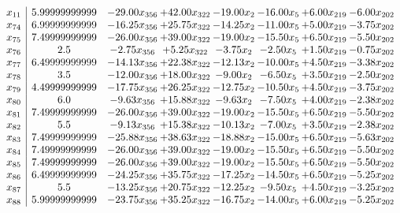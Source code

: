 \documentclass[8pt]{article}
\begin{document}
\[\begin{array}{c| c c@{\hskip 2pt} c@{\hskip 2pt} c@{\hskip 2pt} c@{\hskip 2pt} c@{\hskip 2pt} c@{\hskip 2pt} }
 x_{11}   &  5.99999999999 & -29.00 x_{356} & + 42.00 x_{322} & -19.00 x_{2} & -16.00 x_{5} & +  6.00 x_{219} & -6.00 x_{202}\\
 x_{74}   &  6.99999999999 & -16.25 x_{356} & + 25.75 x_{322} & -14.25 x_{2} & -11.00 x_{5} & +  5.00 x_{219} & -3.75 x_{202}\\
 x_{75}   &  7.49999999999 & -26.00 x_{356} & + 39.00 x_{322} & -19.00 x_{2} & -15.50 x_{5} & +  6.50 x_{219} & -5.50 x_{202}\\
 x_{76}   &  2.5 & -2.75 x_{356} & +  5.25 x_{322} & -3.75 x_{2} & -2.50 x_{5} & +  1.50 x_{219} & -0.75 x_{202}\\
 x_{77}   &  6.49999999999 & -14.13 x_{356} & + 22.38 x_{322} & -12.13 x_{2} & -10.00 x_{5} & +  4.50 x_{219} & -3.38 x_{202}\\
 x_{78}   &  3.5 & -12.00 x_{356} & + 18.00 x_{322} & -9.00 x_{2} & -6.50 x_{5} & +  3.50 x_{219} & -2.50 x_{202}\\
 x_{79}   &  4.49999999999 & -17.75 x_{356} & + 26.25 x_{322} & -12.75 x_{2} & -10.50 x_{5} & +  4.50 x_{219} & -3.75 x_{202}\\
 x_{80}   &  6.0 & -9.63 x_{356} & + 15.88 x_{322} & -9.63 x_{2} & -7.50 x_{5} & +  4.00 x_{219} & -2.38 x_{202}\\
 x_{81}   &  7.49999999999 & -26.00 x_{356} & + 39.00 x_{322} & -19.00 x_{2} & -15.50 x_{5} & +  6.50 x_{219} & -5.50 x_{202}\\
 x_{82}   &  5.5 & -9.13 x_{356} & + 15.38 x_{322} & -10.13 x_{2} & -7.00 x_{5} & +  3.50 x_{219} & -2.38 x_{202}\\
 x_{83}   &  7.49999999999 & -25.88 x_{356} & + 38.63 x_{322} & -18.88 x_{2} & -15.00 x_{5} & +  6.50 x_{219} & -5.63 x_{202}\\
 x_{84}   &  7.49999999999 & -26.00 x_{356} & + 39.00 x_{322} & -19.00 x_{2} & -15.50 x_{5} & +  6.50 x_{219} & -5.50 x_{202}\\
 x_{85}   &  7.49999999999 & -26.00 x_{356} & + 39.00 x_{322} & -19.00 x_{2} & -15.50 x_{5} & +  6.50 x_{219} & -5.50 x_{202}\\
 x_{86}   &  6.49999999999 & -24.25 x_{356} & + 35.75 x_{322} & -17.25 x_{2} & -14.50 x_{5} & +  6.50 x_{219} & -5.25 x_{202}\\
 x_{87}   &  5.5 & -13.25 x_{356} & + 20.75 x_{322} & -12.25 x_{2} & -9.50 x_{5} & +  4.50 x_{219} & -3.25 x_{202}\\
 x_{88}   &  5.99999999999 & -23.75 x_{356} & + 35.25 x_{322} & -16.75 x_{2} & -14.00 x_{5} & +  6.00 x_{219} & -5.25 x_{202}\\

\end{array}\]
\end{document}
